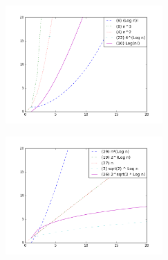 \documentclass{article}
\begin{document}
\begin{figure}[h]
\begin{subfigure}{0.5\textwidth}
\includegraphics[width=1.1\linewidth, height=4.5cm]{img/figure_4.png} 
\label{fig:subim1}
\end{subfigure}
\begin{subfigure}{0.5\textwidth}
\includegraphics[width=1.1\linewidth, height=4.5cm]{img/figure_3.png}
\label{fig:subim2}
\end{subfigure}

\label{fig:image2}
\end{figure}
\end{document}
